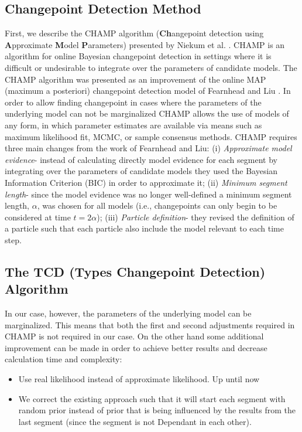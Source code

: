 \documentclass{article}
\begin{document}
\subsection{Changepoint Detection Method}
First, we describe the CHAMP algorithm (\textbf{Ch}angepoint detection using \textbf{A}pproximate \textbf{M}odel \textbf{P}arameters) presented by Niekum et al. \cite{niekum2014champ}. CHAMP is an algorithm for online Bayesian changepoint detection in settings where it is difficult or undesirable to integrate over the parameters of candidate models. The CHAMP algorithm was presented as an improvement of the online MAP (maximum a posteriori) changepoint detection model of Fearnhead and Liu \cite{fearnhead2007line}. In order to allow finding changepoint in cases where the parameters of the underlying model can not be marginalized CHAMP allows the use of models of any form, in which parameter estimates are available via means such as maximum likelihood fit, MCMC, or sample consensus methods. CHAMP requires three main changes from the work of Fearnhead and Liu: (i) \textit{Approximate model evidence}- instead of calculating directly model evidence for each segment by integrating over the parameters of candidate models they used the Bayesian Information Criterion (BIC) in order to approximate it; (ii) \textit{Minimum segment length}- since the model evidence was no longer well-defined a minimum segment length, $\alpha$, was chosen for all models (i.e., changepoints can only begin to be considered at time $t = 2\alpha$); (iii) \textit{Particle definition}- they revised the definition of a particle such that each particle also include the model relevant to each time step. 

\subsection{The TCD (Types Changepoint Detection) Algorithm}
In our case, however, the parameters of the underlying model can be marginalized. This means that both the first and second adjustments required in CHAMP is not required in our case. On the other hand some additional improvement can be made in order to achieve better results and decrease calculation time and complexity:

\begin{itemize}
	\item Use real likelihood instead of approximate likelihood. Up until now  
	\item We correct the existing approach such that it will start each segment with random prior instead of prior that is being influenced by the results from the last segment (since the segment is not Dependant in each other).
\end{itemize}
\end{document}

